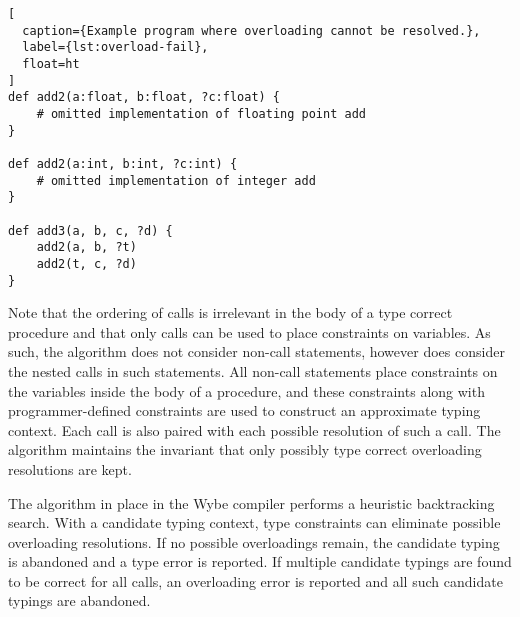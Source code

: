 \begin{lstlisting}[
  caption={Example program where overloading cannot be resolved.},
  label={lst:overload-fail},
  float=ht
]
def add2(a:float, b:float, ?c:float) {
    # omitted implementation of floating point add
}

def add2(a:int, b:int, ?c:int) {
    # omitted implementation of integer add
}

def add3(a, b, c, ?d) {
    add2(a, b, ?t)
    add2(t, c, ?d)
}
\end{lstlisting}

Note that the ordering of calls is irrelevant in the body of a type correct procedure and that only calls can be used to place constraints on variables. As such, the algorithm does not consider non-call statements, however does consider the nested calls in such statements. All non-call statements place constraints on the variables inside the body of a procedure, and these constraints along with programmer-defined constraints are used to construct an approximate typing context. Each call is also paired with each possible resolution of such a call. The algorithm maintains the invariant that only possibly type correct overloading resolutions are kept. 

The algorithm in place in the Wybe compiler performs a heuristic backtracking search. With a candidate typing context, type constraints can eliminate possible overloading resolutions. If no possible overloadings remain, the candidate typing is abandoned and a type error is reported. If multiple candidate typings are found to be correct for all calls, an overloading error is reported and all such candidate typings are abandoned. 
